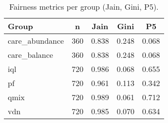 \begin{table}[!t]
\centering
\caption{Fairness metrics per group (Jain, Gini, P5).}
\label{tab:fairness}
\begin{tabular}{l c c c c}
\toprule
Group & n & Jain & Gini & P5 \\
\midrule
care_abundance & 360 & 0.838 & 0.248 & 0.068 \\
care_balance & 360 & 0.838 & 0.248 & 0.068 \\
iql & 720 & 0.986 & 0.068 & 0.655 \\
pf & 720 & 0.961 & 0.113 & 0.342 \\
qmix & 720 & 0.989 & 0.061 & 0.712 \\
vdn & 720 & 0.985 & 0.070 & 0.634 \\
\bottomrule
\end{tabular}
\end{table}